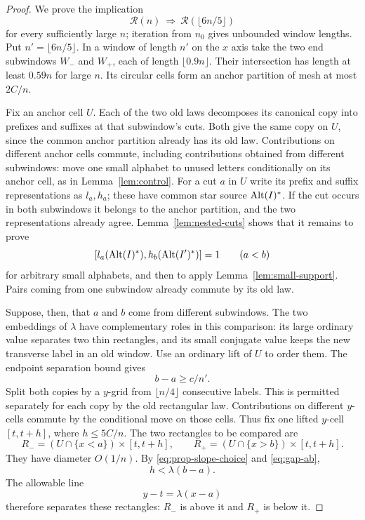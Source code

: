 \begin{proof}
We prove the implication
\[
 \mathcal R(n)\ \Longrightarrow\
 \mathcal R(\lfloor6n/5\rfloor)
\]
for every sufficiently large $n$; iteration from $n_0$ gives
unbounded window lengths.  Put $n'=\lfloor6n/5\rfloor$.
In a window of length $n'$ on the $x$ axis take the two end
subwindows $W_-$ and $W_+$, each of length $\lfloor0.9n\rfloor$.
Their intersection has length at least $0.59n$ for large $n$.
Its circular cells form an anchor partition of mesh at most $2C/n$.

Fix an anchor cell $U$.  Each of the two old laws decomposes its
canonical copy into prefixes and suffixes at that subwindow's cuts.
Both give the same copy on $U$, since the common anchor partition
already has its old law.  Contributions on different anchor cells
commute, including contributions obtained from different subwindows:
move one small alphabet to unused letters conditionally on its
anchor cell, as in Lemma~\ref{lem:control}.  For a cut $a$ in $U$
write its prefix and suffix representations as $l_a,h_a$; these
have common star source $\operatorname{Alt}(I)^\ast$.  If the cut occurs in both
subwindows it belongs to the anchor partition, and the two
representations already agree.  Lemma~\ref{lem:nested-cuts} shows
that it remains to prove
\begin{equation}\label{eq:prefix-suffix}
 [l_a(\operatorname{Alt}(I)^\ast),h_b(\operatorname{Alt}(I')^\ast)]=1\qquad(a<b)
\end{equation}
for arbitrary small alphabets, and then to apply
Lemma~\ref{lem:small-support}.  Pairs coming from one subwindow
already commute by its old law.

Suppose, then, that $a$ and $b$ come from different subwindows.
The two embeddings of $\lambda$ have complementary roles in this
comparison: its large ordinary value separates two thin rectangles,
and its small conjugate value keeps the new transverse label in an old
window.
Use an ordinary lift of $U$ to order them.  The endpoint separation
bound gives
\begin{equation}\label{eq:gap-ab}
 b-a\ge c/n'.
\end{equation}
Split both copies by a $y$-grid from $\lfloor n/4\rfloor$
consecutive labels.  This is permitted separately for each copy
by the old rectangular law.  Contributions on different
$y$-cells commute by the conditional move on those cells.
Thus fix one lifted $y$-cell $[t,t+h]$, where $h\le5C/n$.
The two rectangles to be compared are
\[
 R_-=(U\cap\{x<a\})\times[t,t+h],\qquad
 R_+=(U\cap\{x>b\})\times[t,t+h].
\]
They have diameter $O(1/n)$.  By
\eqref{eq:prop-slope-choice} and \eqref{eq:gap-ab},
\begin{equation}\label{eq:slope-separation}
 h<\lambda(b-a).
\end{equation}
The allowable line
\begin{equation}\label{eq:separating-line}
 y-t=\lambda(x-a)
\end{equation}
therefore separates these rectangles: $R_-$ is above it and
$R_+$ is below it.


\end{proof}
